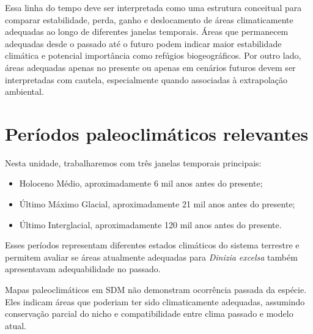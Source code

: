 \documentclass{ueap-sdm}
\begin{document}
Essa linha do tempo deve ser interpretada como uma estrutura conceitual para
comparar estabilidade, perda, ganho e deslocamento de áreas climaticamente
adequadas ao longo de diferentes janelas temporais. Áreas que permanecem
adequadas desde o passado até o futuro podem indicar maior estabilidade
climática e potencial importância como refúgios biogeográficos. Por outro lado,
áreas adequadas apenas no presente ou apenas em cenários futuros devem ser
interpretadas com cautela, especialmente quando associadas à extrapolação
ambiental.

\begin{center}
\end{center}

\section{Períodos paleoclimáticos relevantes}

Nesta unidade, trabalharemos com três janelas temporais principais:

\begin{itemize}
	\item Holoceno Médio, aproximadamente 6 mil anos antes do presente;
	\item Último Máximo Glacial, aproximadamente 21 mil anos antes do presente;
	\item Último Interglacial, aproximadamente 120 mil anos antes do presente.
\end{itemize}

Esses períodos representam diferentes estados climáticos do sistema terrestre e permitem avaliar se áreas atualmente adequadas para \textit{Dinizia excelsa} também apresentavam adequabilidade no passado.

\begin{atencao}[title={\faExclamationTriangle\quad Projeções paleoclimáticas são hipóteses}]
	Mapas paleoclimáticos em SDM não demonstram ocorrência passada da espécie. Eles indicam áreas que poderiam ter sido climaticamente adequadas, assumindo conservação parcial do nicho e compatibilidade entre clima passado e modelo atual.
\end{atencao}
\end{document}
